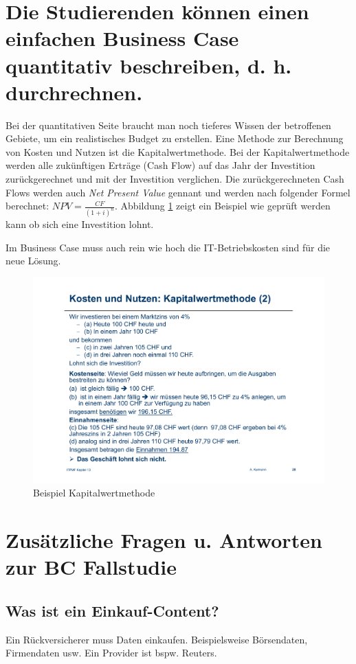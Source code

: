 \section{Die Studierenden können einen einfachen Business Case quantitativ beschreiben, d. h. durchrechnen.}

Bei der quantitativen Seite braucht man noch tieferes Wissen der betroffenen Gebiete, um ein realistisches Budget zu erstellen. Eine Methode zur Berechnung von Kosten und Nutzen ist die Kapitalwertmethode. Bei der Kapitalwertmethode werden alle zukünftigen Erträge (Cash Flow) auf das Jahr der Investition zurückgerechnet und mit der Investition verglichen. Die zurückgerechneten Cash Flows werden auch \emph{Net Present Value} gennant und werden nach folgender Formel berechnet: $NPV=\frac{CF}{(1+i)^n}$. Abbildung \ref{fig:kapitalwertmethode} zeigt ein Beispiel wie geprüft werden kann ob sich eine Investition lohnt.

Im Business Case muss auch rein wie hoch die IT-Betriebskosten sind für die neue Lösung.

\begin{figure}[h!]
\centering
\includegraphics[width=0.8\linewidth]{fig/kapitalwertmethode}
\caption{Beispiel Kapitalwertmethode}
\label{fig:kapitalwertmethode}
\end{figure}

\section{Zusätzliche Fragen u. Antworten zur BC Fallstudie}
\subsection{Was ist ein Einkauf-Content?}
Ein Rückversicherer muss Daten einkaufen. Beispielsweise Börsendaten, Firmendaten usw. Ein Provider ist bspw. Reuters.

